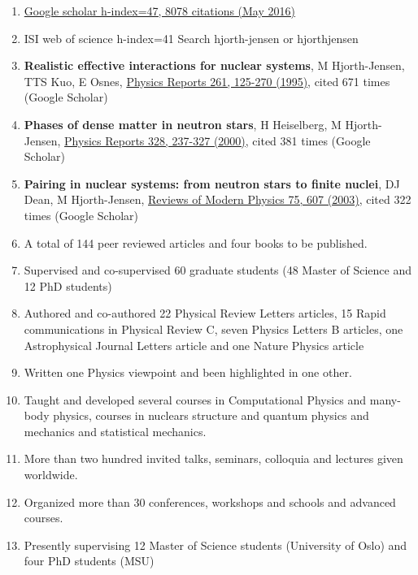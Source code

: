 \documentclass[%
oneside,                 %
final,                   %
10pt]{article}
\begin{document}
\begin{enumerate}
\item \href{{https://scholar.google.com/citations?user=nuiyEmwAAAAJ&hl=en}}{Google scholar h-index=47, 8078 citations (May 2016)}

\item ISI web of science h-index=41 Search hjorth-jensen or hjorthjensen 

\item \textbf{Realistic effective interactions for nuclear systems}, M Hjorth-Jensen, TTS Kuo, E Osnes, \href{{http://www.sciencedirect.com/science/article/pii/0370157395000126}}{Physics Reports 261, 125-270 (1995)}, cited 671 times (Google Scholar)

\item \textbf{Phases of dense matter in neutron stars}, H Heiselberg, M Hjorth-Jensen, \href{{http://www.sciencedirect.com/science/article/pii/S0370157399001106}}{Physics Reports 328, 237-327 (2000)}, cited 381 times (Google Scholar)

\item \textbf{Pairing in nuclear systems: from neutron stars to finite nuclei}, DJ Dean, M Hjorth-Jensen, \href{{http://journals.aps.org/rmp/abstract/10.1103/RevModPhys.75.607}}{Reviews of Modern Physics 75, 607  (2003)}, cited 322 times (Google Scholar)

\item A total of 144 peer reviewed articles and four books to be published.

\item Supervised and co-supervised 60 graduate students (48 Master of Science and 12 PhD students)

\item Authored and co-authored 22 Physical Review Letters articles, 15 Rapid communications in Physical Review C, seven Physics Letters B articles, one Astrophysical Journal Letters article and one Nature Physics article

\item Written one Physics viewpoint and been highlighted in one other.

\item Taught and developed several courses in Computational Physics and many-body physics, courses in nuclears structure and quantum physics and mechanics and statistical mechanics.

\item More than two hundred invited talks, seminars, colloquia and lectures given worldwide.

\item Organized more than 30 conferences, workshops and schools and advanced courses.

\item Presently supervising 12 Master of Science students (University of Oslo) and four PhD students (MSU)
\end{enumerate}
\end{document}
